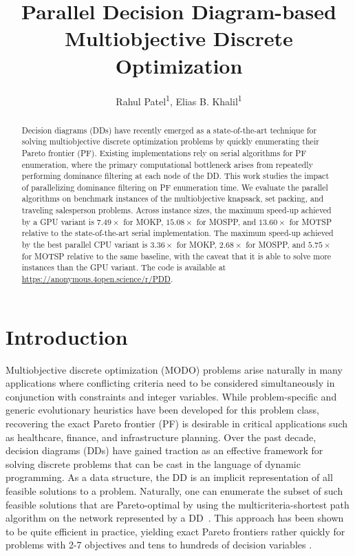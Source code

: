 \documentclass[letterpaper]{article}
\title{Parallel Decision Diagram-based Multiobjective Discrete Optimization} %
\author{
Rahul Patel\textsuperscript{\rm 1},
Elias B. Khalil\textsuperscript{\rm 1}
}
\begin{document}
\maketitle

\begin{abstract}
Decision diagrams (DDs) have recently emerged as a state-of-the-art technique for solving multiobjective discrete optimization problems by quickly enumerating their Pareto frontier (PF). Existing implementations rely on serial algorithms for PF enumeration, where the primary computational bottleneck arises from repeatedly performing dominance filtering at each node of the DD.
This work studies the impact of parallelizing dominance filtering on PF enumeration time. We evaluate the parallel algorithms on benchmark instances of the multiobjective knapsack, set packing, and traveling salesperson problems.
Across instance sizes, the maximum speed-up achieved by a GPU variant is $7.49\times$ for MOKP, $15.08\times$ for MOSPP, and $13.60\times$ for MOTSP relative to the state-of-the-art serial implementation.
The maximum speed-up achieved by the best parallel CPU variant is $3.36\times$ for MOKP, $2.68\times$ for MOSPP, and $5.75\times$ for MOTSP relative to the same baseline, with the caveat that it is able to solve more instances than the GPU variant.
The code is available at \url{https://anonymous.4open.science/r/PDD}.
\end{abstract}


\section{Introduction}
Multiobjective discrete optimization (MODO) \cite{ehrgott2005multicriteria,ehrgott2016exact,miettinen1999nonlinear} problems arise naturally in many applications where conflicting criteria need to be considered simultaneously in conjunction with constraints and integer variables. While problem-specific \cite{Vianna2014AMG} and generic evolutionary heuristics \cite{Deb2002AFA} have been developed for this problem class, recovering the exact Pareto frontier (PF) is desirable in critical applications such as healthcare, finance, and infrastructure planning. Over the past decade, decision diagrams (DDs) \cite{Cir2018DecisionDF} have gained traction as an effective framework for solving discrete problems that can be cast in the language of dynamic programming. As a data structure, the DD is an implicit representation of all feasible solutions to a problem. Naturally, one can enumerate the subset of such feasible solutions that are Pareto-optimal by using the multicriteria-shortest path algorithm on the network represented by a DD~\cite{garroppo2010survey}. This approach has been shown to be quite efficient in practice, yielding exact Pareto frontiers rather quickly for problems with 2-7 objectives and tens to hundreds of decision variables \cite{bergman2022network}.
\end{document}
